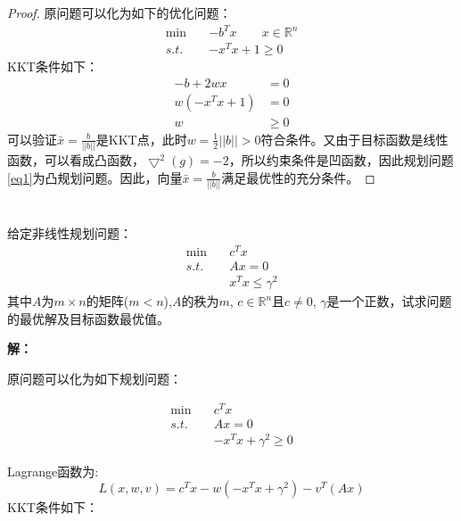 \documentclass[a4paper]{article}
\begin{document}
\begin{proof}
	原问题可以化为如下的优化问题：
	\begin{equation}
	\label{eq1}
	\begin{aligned}
	\min \quad &-b^Tx \qquad x\in \mathbb{R}^n\\
	s.t. \quad &-x^Tx+1\ge 0
	\end{aligned}
	\end{equation}
	KKT条件如下：
	\begin{equation}
	\begin{aligned}
	-b+2wx&=0\\
	w(-x^Tx+1)&=0 \\
	w&\ge 0
	\end{aligned}
	\end{equation}
	可以验证$\bar{x}=\frac{b}{||b||}$是KKT点，此时$w=\frac{1}{2}||b||>0$符合条件。又由于目标函数是线性函数，可以看成凸函数，$\bigtriangledown^2(g)=-2$，所以约束条件是凹函数，因此规划问题\ref{eq1}为凸规划问题。因此，向量$\bar{x}=\frac{b}{||b||}$满足最优性的充分条件。
\end{proof}

\section{}
给定非线性规划问题：
\begin{equation}
\begin{aligned}
\min \quad &c^Tx \\
s.t. \quad &Ax=0 \\
& x^Tx \le \gamma^2
\end{aligned}
\end{equation}
其中$A$为$m\times n$的矩阵($m<n$),$A$的秩为$m$, $c\in \mathbb{R}^n$且$c\neq 0$, $\gamma$是一个正数，试求问题的最优解及目标函数最优值。

\textbf{解：}

原问题可以化为如下规划问题：

\begin{equation}
\begin{aligned}
\min \quad &c^Tx \\
s.t. \quad &Ax=0 \\
& -x^Tx + \gamma^2 \ge 0
\end{aligned}
\end{equation}

Lagrange函数为:
\begin{equation}
L(x,w,v)=c^Tx-w(-x^Tx+\gamma^2)-v^T(Ax)
\end{equation}
KKT条件如下：
\end{document}
